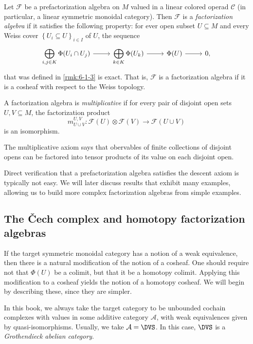 \begin{definition}\label{dfn:6-1-7}
	Let $\mathcal{F} $ be a prefactorization algebra on $M$ valued in a linear colored operad $\mathcal{C} $ (in particular, a linear symmetric monoidal category). Then $\mathcal{F} $ is a \emph{factorization algebra} if it satisfies the following property: for ever open subset $U\subseteq M$ and every Weiss cover $\left\{ U_i \subseteq U \right\} _{i\in I} $ of $U$, the sequence
\[\begin{tikzcd}[row sep = 2.5em, column sep = 2.5em]
	\displaystyle{\bigoplus_{i,j\in K} \Phi (U_i \cap U_j)}\ar[r]   & \displaystyle{\bigoplus_{k\in K} \Phi (U_k)}\ar[r]  & \Phi (U)\ar[r]  & 0,
\end{tikzcd}\]
that was defined in \cref{rmk:6-1-3} is exact. That is, $\mathcal{F} $ is a factorization algebra if it is a cosheaf with respect to the Weiss topology.

A factorization algebra is \emph{multiplicative} if for every pair of disjoint open sets $U,V\subseteq M$, the factorization product
\[
	m_{U \cup V} ^{U,V} : \mathcal{F} (U)\otimes \mathcal{F} (V) \to \mathcal{F} (U\cup V)
\]
is an isomorphism.
\end{definition}

The multiplicative axiom says that obervables of finite collections of disjoint opens can be factored into tensor products of its value on each disjoint open.

Direct verification that a prefactorization algebra satisfies the descent axiom is typically not easy. We will later discuss results that exhibit many examples, allowing us to build more complex factorization algebras from simple examples.

\subsection{The \v{C}ech complex and homotopy factorization algebras}

If the target symmetric monoidal category has a notion of a weak equivalence, then there is a natural modification of the notion of a cosheaf. One should require not that $\Phi (U)$ be a colimit, but that it be a homotopy colimit. Applying this modification to a cosheaf yields the notion of a homotopy cosheaf. We will begin by describing these, since they are simpler.

In this book, we always take the target category to be unbounded cochain complexes with values in some additive category $\mathcal{A} $, with weak equivalences given by quasi-isomorphisms. Usually, we take $\mathcal{A} =\DVS $. In this case, $\DVS $ is a \emph{Grothendieck abelian category}.

